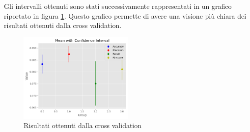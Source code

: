 Gli intervalli ottenuti sono stati successivamente rappresentati in un grafico
riportato in figura \ref{fig:risultatiCrossValidation}. Questo grafico permette
di avere una visione più chiara dei risultati ottenuti dalla cross validation.

\begin{figure}[!ht]
    \centering
    \includegraphics[width=0.5\textwidth]{img/rete/intervalli_confidenza.png}
    \caption{Risultati ottenuti dalla cross validation}
    \label{fig:risultatiCrossValidation}
\end{figure}